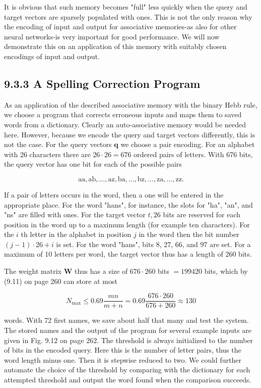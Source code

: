 \documentclass[10pt]{book}
\begin{document}
\begin{center}
\begin{enumerate}
\begin{center}
\begin{center}
\begin{center}
It is obvious that such memory becomes "full" less quickly when the query and target vectors are sparsely populated with ones. This is not the only reason why the encoding of input and output for associative memories-as also for other neural networks-is very important for good performance. We will now demonstrate this on an application of this memory with suitably chosen encodings of input and output.

\subsection*{9.3.3 A Spelling Correction Program}
As an application of the described associative memory with the binary Hebb rule, we choose a program that corrects erroneous inputs and maps them to saved words from a dictionary. Clearly an auto-associative memory would be needed here. However, because we encode the query and target vectors differently, this is not the case. For the query vectors $\boldsymbol{q}$ we choose a pair encoding. For an alphabet with 26 characters there are $26 \cdot 26=676$ ordered pairs of letters. With 676 bits, the query vector has one bit for each of the possible pairs

$$
\mathrm{aa}, \mathrm{ab}, \ldots, \mathrm{az}, \mathrm{ba}, \ldots, \mathrm{bz}, \ldots, \mathrm{za}, \ldots, \mathrm{zz} .
$$

If a pair of letters occurs in the word, then a one will be entered in the appropriate place. For the word "hans", for instance, the slots for "ha", "an", and "ns" are filled with ones. For the target vector $t, 26$ bits are reserved for each position in the word up to a maximum length (for example ten characters). For the $i$ th letter in the alphabet in position $j$ in the word then the bit number $(j-1) \cdot 26+i$ is set. For the word "hans", bits 8, 27, 66, and 97 are set. For a maximum of 10 letters per word, the target vector thus has a length of 260 bits.

The weight matrix $\boldsymbol{W}$ thus has a size of $676 \cdot 260$ bits $=199420$ bits, which by (9.11) on page 260 can store at most

$$
N_{\max } \leq 0.69 \frac{m n}{m+n}=0.69 \frac{676 \cdot 260}{676+260} \approx 130
$$

words. With 72 first names, we save about half that many and test the system. The stored names and the output of the program for several example inputs are given in Fig. 9.12 on page 262. The threshold is always initialized to the number of bits in the encoded query. Here this is the number of letter pairs, thus the word length minus one. Then it is stepwise reduced to two. We could further automate the choice of the threshold by comparing with the dictionary for each attempted threshold and output the word found when the comparison succeeds.


\end{center}
\end{center}
\end{center}
\end{enumerate}
\end{center}
\end{document}
